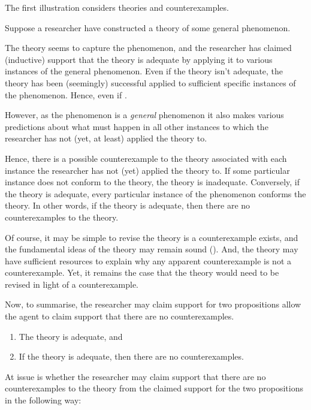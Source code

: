 \begin{note}
  The first illustration considers theories and counterexamples.

  \begin{illustration}
    \label{ill:CE:main}
    Suppose a researcher have constructed a theory of some general phenomenon.

    The theory seems to capture the phenomenon, and the researcher has claimed (inductive) support that the theory is adequate by applying it to various instances of the general phenomenon.
    Even if the theory isn't adequate, the theory has been (seemingly) successful applied to sufficient specific instances of the phenomenon.
    Hence, even if \mom{}.

    However, as the phenomenon is a \emph{general} phenomenon it also makes various predictions about what must happen in all other instances to which the researcher has not (yet, at least) applied the theory to.

    Hence, there is a possible counterexample to the theory associated with each instance the researcher has not (yet) applied the theory to.
    If some particular instance does not conform to the theory, the theory is inadequate.
    Conversely, if the theory is adequate, every particular instance of the phenomenon conforms the theory.
    In other words, if the theory is adequate, then there are no counterexamples to the theory.

    Of course, it may be simple to revise the theory is a counterexample exists, and the fundamental ideas of the theory may remain sound (\cite[Cf.][]{Bonevac:2011tz}).
    And, the theory may have sufficient resources to explain why any apparent counterexample is not a counterexample.
    Yet, it remains the case that the theory would need to be revised in light of a counterexample.

    Now, to summarise, the researcher may claim support for two propositions allow the agent to claim support that there are no counterexamples.

    \begin{enumerate}
    \item The theory is adequate, and
    \item If the theory is adequate, then there are no counterexamples.
    \end{enumerate}

    At issue is whether the researcher may claim support that there are no counterexamples to the theory from the claimed support for the two propositions in the following way:


\end{illustration}
\end{note}
